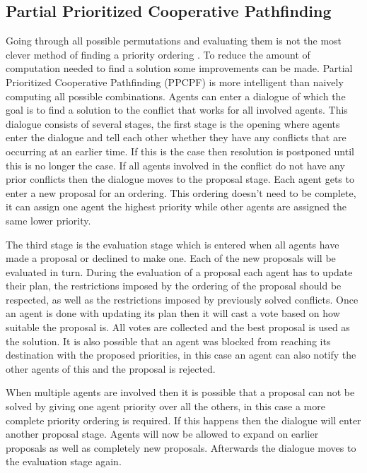 \subsection{Partial Prioritized Cooperative Pathfinding}
Going through all possible permutations and evaluating them is not the most
clever method of finding a priority ordering \cite{bennewitz2002}. To reduce
the amount of computation needed to find a solution some improvements can be
made. Partial Prioritized Cooperative Pathfinding (PPCPF) is more intelligent
than naively computing all possible combinations. Agents can enter a
dialogue of which the goal is to find a solution to
the conflict that works for all involved agents. This dialogue consists of
several stages, the first stage is the opening where agents enter the dialogue
and tell each other whether they have any conflicts that are occurring at an
earlier time. If this is the case then resolution is postponed until this is
no longer the case. If all agents involved in the conflict do not have any
prior conflicts then the dialogue moves to the proposal stage. Each agent
gets to enter a new proposal for an ordering. This ordering doesn't need to be
complete, it can assign one agent the highest priority while other agents are
assigned the same lower priority.

The third stage is the evaluation stage which is entered when all agents have
made a proposal or declined to make one. Each of the new proposals will be
evaluated in turn. During the evaluation of a proposal each agent has to update
their plan, the restrictions imposed by the ordering of the proposal should be
respected, as well as the restrictions imposed by previously solved conflicts.
Once an
agent is done with updating its plan then it will cast a vote based on how
suitable the proposal is. All votes are collected and the best proposal is
used as the solution. It is also possible that an agent was blocked from
reaching its destination with the proposed priorities, in this case an agent
can also notify the other agents of this and the proposal is rejected.

When multiple agents are involved then it is possible that a proposal can not
be solved by giving one agent priority over all the others, in this case a more
complete priority ordering is required. If this happens then the dialogue will
enter another proposal stage. Agents will now be allowed to expand on earlier
proposals as well as completely new proposals. Afterwards the dialogue moves to
the evaluation stage again.

